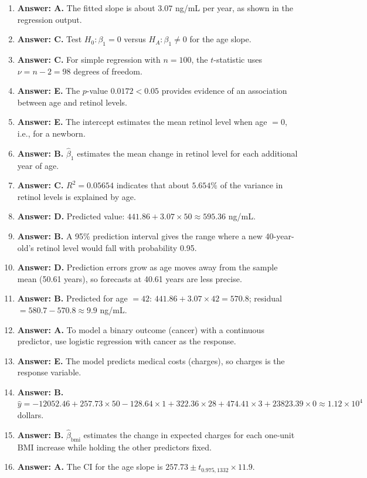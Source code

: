 \documentclass[11pt]{article}
\begin{document}
\begin{enumerate}[label=\textbf{Q\arabic*:}, leftmargin=*, itemsep=0.9em]
\item \textbf{Answer: A.} The fitted slope is about $3.07$ ng/mL per year, as shown in the regression output.
\item \textbf{Answer: C.} Test $H_0\!:\beta_1 = 0$ versus $H_A\!:\beta_1 \ne 0$ for the age slope.
\item \textbf{Answer: C.} For simple regression with $n=100$, the $t$-statistic uses $\nu = n-2 = 98$ degrees of freedom.
\item \textbf{Answer: E.} The $p$-value $0.0172 < 0.05$ provides evidence of an association between age and retinol levels.
\item \textbf{Answer: E.} The intercept estimates the mean retinol level when age $=0$, i.e., for a newborn.
\item \textbf{Answer: B.} $\hat{\beta}_1$ estimates the mean change in retinol level for each additional year of age.
\item \textbf{Answer: C.} $R^2 = 0.05654$ indicates that about $5.654\%$ of the variance in retinol levels is explained by age.
\item \textbf{Answer: D.} Predicted value: $441.86 + 3.07\times 50 \approx 595.36$ ng/mL.
\item \textbf{Answer: B.} A 95\% prediction interval gives the range where a new 40-year-old's retinol level would fall with probability 0.95.
\item \textbf{Answer: D.} Prediction errors grow as age moves away from the sample mean (50.61 years), so forecasts at 40.61 years are less precise.
\item \textbf{Answer: B.} Predicted for age $=42$: $441.86 + 3.07\times 42 = 570.8$; residual $= 580.7 - 570.8 \approx 9.9$ ng/mL.
\item \textbf{Answer: A.} To model a binary outcome (cancer) with a continuous predictor, use logistic regression with cancer as the response.
\item \textbf{Answer: E.} The model predicts medical costs (charges), so charges is the response variable.
\item \textbf{Answer: B.} $\hat{y} = -12052.46 + 257.73\times 50 -128.64\times 1 + 322.36\times 28 + 474.41\times 3 + 23823.39\times 0 \approx 1.12\times 10^4$ dollars.
\item \textbf{Answer: B.} $\hat{\beta}_{\text{bmi}}$ estimates the change in expected charges for each one-unit BMI increase while holding the other predictors fixed.
\item \textbf{Answer: A.} The CI for the age slope is $257.73 \pm t_{0.975,1332}\times 11.9$.

\end{enumerate}
\end{document}
